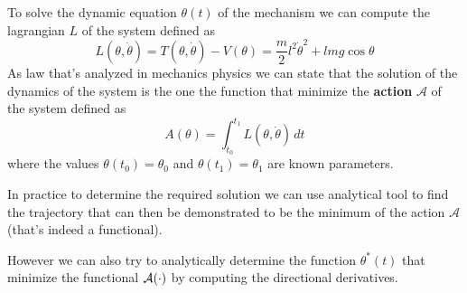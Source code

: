 To solve the dynamic equation $\theta(t)$ of the mechanism we can compute the lagrangian $L $ of the system defined as
\[ L (\theta,\dot\theta) = T(\theta,\dot\theta)-V(\theta) = \frac m 2 l^2\dot\theta^2 + lmg\cos\theta \]
As law that's analyzed in mechanics physics we can state that the solution of the dynamics of the system is the one the function that minimize the \textbf{action} $\mathcal A$ of the system defined as
\begin{equation} \label{eq:func:action}
	A(\theta) = \int_{t_0}^{t_1} L (\theta,\dot\theta)\, dt
\end{equation}
where the values $\theta(t_0)= \theta_0$ and $\theta(t_1)=\theta_1$ are known parameters.

In practice to determine the required solution we can use analytical tool to find the trajectory that can then be demonstrated to be the minimum of the action $\mathcal A$ (that's indeed a functional).

However we can also try to analytically determine the function $\theta^*(t)$ that minimize the functional $\mathcal{A}(\cdot)$ by computing the directional derivatives. \vspace{3mm}

